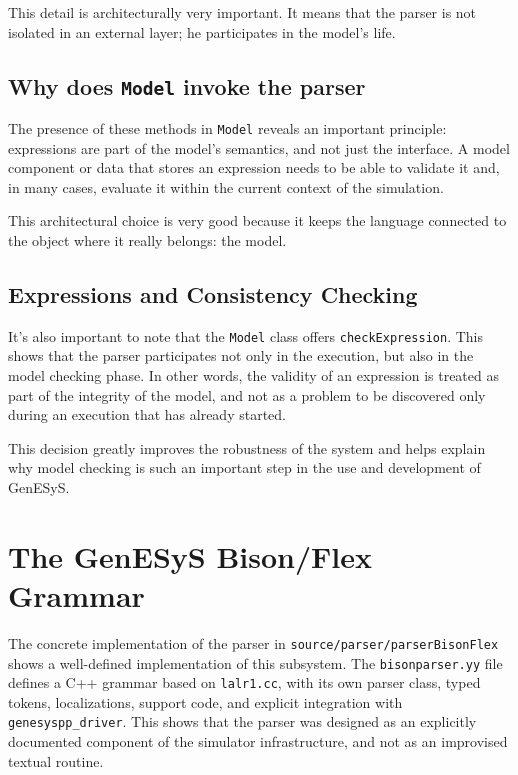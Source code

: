 This detail is architecturally very important. It means that the parser is not isolated in an external layer; he participates in the model's life.

\subsection{Why does \texttt{Model} invoke the parser}
\label{subsec:cap9_por_que_model_invoca_parser}

The presence of these methods in \texttt{Model} reveals an important principle: expressions are part of the model's semantics, and not just the interface. A model component or data that stores an expression needs to be able to validate it and, in many cases, evaluate it within the current context of the simulation.

This architectural choice is very good because it keeps the language connected to the object where it really belongs: the model.

\subsection{Expressions and Consistency Checking}
\label{subsec:cap9_expressoes_verificacao_consistencia}

It's also important to note that the \texttt{Model} class offers \texttt{checkExpression}. This shows that the parser participates not only in the execution, but also in the model checking phase. In other words, the validity of an expression is treated as part of the integrity of the model, and not as a problem to be discovered only during an execution that has already started.

This decision greatly improves the robustness of the system and helps explain why model checking is such an important step in the use and development of GenESyS.

\section{The GenESyS Bison/Flex Grammar}
\label{sec:cap9_gramatica_bison_flex}

The concrete implementation of the parser in \texttt{source/parser/parserBisonFlex} shows a well-defined implementation of this subsystem. The \texttt{bisonparser.yy} file defines a C++ grammar based on \texttt{lalr1.cc}, with its own parser class, typed tokens, localizations, support code, and explicit integration with \texttt{genesyspp\_driver}. This shows that the parser was designed as an explicitly documented component of the simulator infrastructure, and not as an improvised textual routine.

